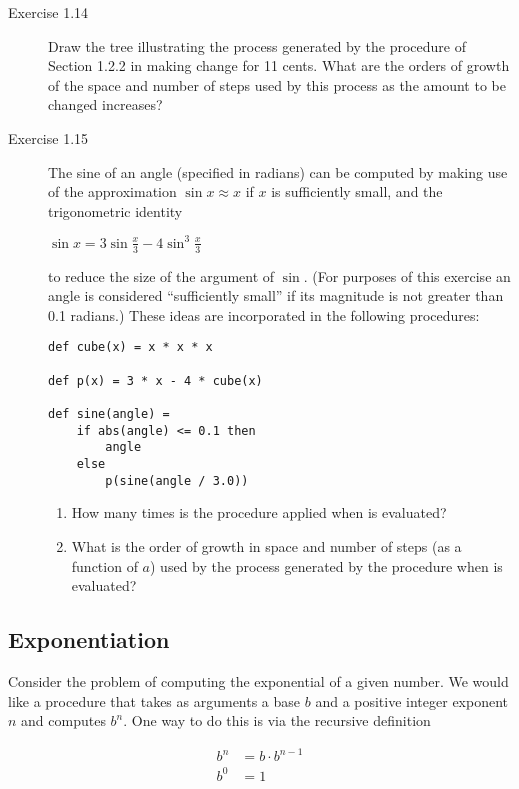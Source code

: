 \begin{description}
\item[Exercise 1.14] Draw the tree illustrating the process generated by the  procedure of Section 1.2.2 in making change for 11 cents. What are the orders of growth of the space and number of steps used by this process as the amount to be changed increases?

\item[Exercise 1.15] The sine of an angle (specified in radians) can be computed by making use of the approximation $\sin x \approx x$ if $x$ is sufficiently small, and the trigonometric identity

$\sin x = 3 \sin \frac{x}{3} - 4 \sin^3 \frac{x}{3}$

to reduce the size of the argument of $\sin$. (For purposes of this exercise an angle is considered ``sufficiently small'' if its magnitude is not greater than 0.1 radians.) These ideas are incorporated in the following procedures:

\begin{lstlisting}
def cube(x) = x * x * x

def p(x) = 3 * x - 4 * cube(x)

def sine(angle) =
    if abs(angle) <= 0.1 then
        angle
    else
        p(sine(angle / 3.0))
\end{lstlisting}

\begin{enumerate}[label=\alph*.]
\item How many times is the procedure  applied when  is evaluated?
\item What is the order of growth in space and number of steps (as a function of $a$) used by the process generated by the  procedure when  is evaluated?
\end{enumerate}
\end{description}

\subsection{Exponentiation}

Consider the problem of computing the exponential of a given number. We would like a procedure that takes as arguments a base $b$ and a positive integer exponent $n$ and computes $b^n$. One way to do this is via the recursive definition

\begin{align}
b^n &= b \cdot b^{n-1} \\
b^0 &= 1
\end{align}

